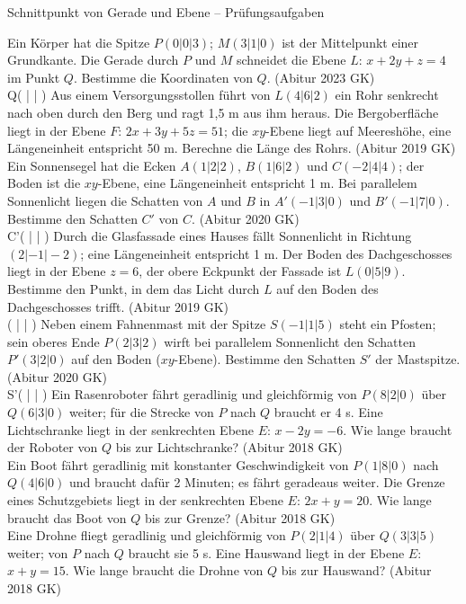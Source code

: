 \begin{aufgabe}{Schnittpunkt von Gerade und Ebene – Prüfungsaufgaben}
\begin{teile}
\teil Ein Körper hat die Spitze $P(0|0|3)$; $M(3|1|0)$ ist der Mittelpunkt einer Grundkante. Die Gerade durch $P$ und $M$ schneidet die Ebene $L$: $x + 2y + z = 4$ im Punkt $Q$. Bestimme die Koordinaten von $Q$. \hfill (Abitur 2023 GK) \\ Q( \leerfeld | \leerfeld | \leerfeld )
\teil Aus einem Versorgungsstollen führt von $L(4|6|2)$ ein Rohr senkrecht nach oben durch den Berg und ragt 1,5 m aus ihm heraus. Die Bergoberfläche liegt in der Ebene $F$: $2x + 3y + 5z = 51$; die $xy$-Ebene liegt auf Meereshöhe, eine Längeneinheit entspricht 50 m. Berechne die Länge des Rohrs. \hfill (Abitur 2019 GK) \\ \leerfeld[m]
\teil Ein Sonnensegel hat die Ecken $A(1|2|2)$, $B(1|6|2)$ und $C(-2|4|4)$; der Boden ist die $xy$-Ebene, eine Längeneinheit entspricht 1 m. Bei parallelem Sonnenlicht liegen die Schatten von $A$ und $B$ in $A'(-1|3|0)$ und $B'(-1|7|0)$. Bestimme den Schatten $C'$ von $C$. \hfill (Abitur 2020 GK) \\ C'( \leerfeld | \leerfeld | \leerfeld )
\teil Durch die Glasfassade eines Hauses fällt Sonnenlicht in Richtung $(2|-1|-2)$; eine Längeneinheit entspricht 1 m. Der Boden des Dachgeschosses liegt in der Ebene $z = 6$, der obere Eckpunkt der Fassade ist $L(0|5|9)$. Bestimme den Punkt, in dem das Licht durch $L$ auf den Boden des Dachgeschosses trifft. \hfill (Abitur 2019 GK) \\ ( \leerfeld | \leerfeld | \leerfeld )
\teil Neben einem Fahnenmast mit der Spitze $S(-1|1|5)$ steht ein Pfosten; sein oberes Ende $P(2|3|2)$ wirft bei parallelem Sonnenlicht den Schatten $P'(3|2|0)$ auf den Boden ($xy$-Ebene). Bestimme den Schatten $S'$ der Mastspitze. \hfill (Abitur 2020 GK) \\ S'( \leerfeld | \leerfeld | \leerfeld )
\teil Ein Rasenroboter fährt geradlinig und gleichförmig von $P(8|2|0)$ über $Q(6|3|0)$ weiter; für die Strecke von $P$ nach $Q$ braucht er 4 s. Eine Lichtschranke liegt in der senkrechten Ebene $E$: $x - 2y = -6$. Wie lange braucht der Roboter von $Q$ bis zur Lichtschranke? \hfill (Abitur 2018 GK) \\ \leerfeld[s]
\teil Ein Boot fährt geradlinig mit konstanter Geschwindigkeit von $P(1|8|0)$ nach $Q(4|6|0)$ und braucht dafür 2 Minuten; es fährt geradeaus weiter. Die Grenze eines Schutzgebiets liegt in der senkrechten Ebene $E$: $2x + y = 20$. Wie lange braucht das Boot von $Q$ bis zur Grenze? \hfill (Abitur 2018 GK) \\ \leerfeld[min]
\teil Eine Drohne fliegt geradlinig und gleichförmig von $P(2|1|4)$ über $Q(3|3|5)$ weiter; von $P$ nach $Q$ braucht sie 5 s. Eine Hauswand liegt in der Ebene $E$: $x + y = 15$. Wie lange braucht die Drohne von $Q$ bis zur Hauswand? \hfill (Abitur 2018 GK) \\ \leerfeld[s]
\end{teile}
\end{aufgabe}

